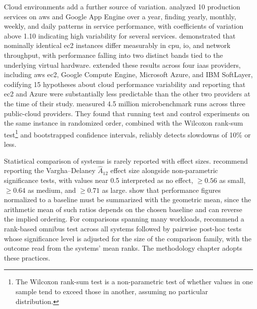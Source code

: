Cloud environments add a further source of variation. \textcite{iosup2011_performance_variability_cloud_services} analyzed \num{10} production services on \acrlong{aws} and Google App Engine over a year, finding yearly, monthly, weekly, and daily patterns in service performance, with coefficients of variation above \num{1.10} indicating high variability for several services. \textcite{schad2010_runtime_measurements_cloud} demonstrated that nominally identical \acrfull{ec2} instances differ measurably in \acrfull{cpu}, \acrshort{io}, and network throughput, with performance falling into two distinct bands tied to the underlying virtual hardware. \textcite{leitner2016_patterns_chaos_iaas} extended these results across four \acrshort{iaas} providers, including \acrshort{aws} \acrshort{ec2}, Google Compute Engine, Microsoft Azure, and IBM SoftLayer, codifying \num{15} hypotheses about cloud performance variability and reporting that \acrshort{ec2} and Azure were substantially less predictable than the other two providers at the time of their study. \textcite{laaber2019_software_microbenchmarking_cloud} measured \num{4.5} million microbenchmark runs across three public-cloud providers. They found that running test and control experiments on the same instance in randomized order, combined with the Wilcoxon rank-sum test\footnote{The Wilcoxon rank-sum test is a non-parametric test of whether values in one sample tend to exceed those in another, assuming no particular distribution.} and bootstrapped confidence intervals, reliably detects slowdowns of \num{10}\% or less.

Statistical comparison of systems is rarely reported with effect sizes. \textcite{arcuri2014_hitchhiker_statistical_tests} recommend reporting the Vargha--Delaney $\hat{A}_{12}$ effect size alongside non-parametric significance tests, with values near \num{0.5} interpreted as no effect, $\geq \num{0.56}$ as small, $\geq \num{0.64}$ as medium, and $\geq \num{0.71}$ as large. \textcite{fleming1986_how_not_to_lie_with_statistics} show that performance figures normalized to a baseline must be summarized with the geometric mean, since the arithmetic mean of such ratios depends on the chosen baseline and can reverse the implied ordering. For comparisons spanning many workloads, \textcite{demsar2006_statistical_comparisons_classifiers} recommend a rank-based omnibus test across all systems followed by pairwise post-hoc tests whose significance level is adjusted for the size of the comparison family, with the outcome read from the systems' mean ranks. The methodology chapter adopts these practices.